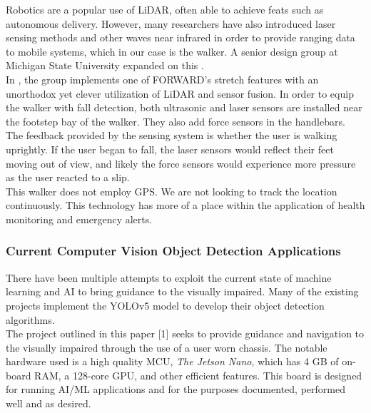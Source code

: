 \noindent Robotics are a popular use of LiDAR, often able to achieve feats such as autonomous delivery. However, many researchers have also introduced laser sensing methods and other waves near infrared in order to provide ranging data to mobile systems, which in our case is the walker. A senior design group at Michigan State University expanded on this \cite{mstate}.\\

\noindent In \cite{FallDetect}, the group implements one of FORWARD's stretch features with an unorthodox yet clever utilization of LiDAR and sensor fusion. In order to equip the walker with fall detection, both ultrasonic and laser sensors are installed near the footstep bay of the walker. They also add force sensors in the handlebars. The feedback provided by the sensing system is whether the user is walking uprightly. If the user began to fall, the laser sensors would reflect their feet moving out of view, and likely the force sensors would experience more pressure as the user reacted to a slip. \\

\noindent This walker does not employ GPS. We are not looking to track the location continuously. This technology has more of a place within the application of health monitoring and emergency alerts.\\

\subsubsection{Current Computer Vision Object Detection Applications}

\noindent There have been multiple attempts to exploit the current state of machine learning and AI to bring guidance to the visually impaired. Many of the existing projects implement the YOLOv5 model to develop their object detection algorithms.\\

\noindent The project outlined in this paper [1] seeks to provide guidance and navigation to the visually impaired through the use of a user worn chassis. The notable hardware used is a high quality MCU, \textit{The Jetson Nano}, which has 4 GB of on-board RAM, a 128-core GPU, and other efficient features. This board is designed for running AI/ML applications and for the purposes documented, performed well and as desired. \\

